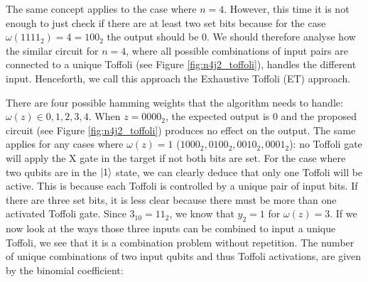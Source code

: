 \documentclass[12pt,a4paper]{article}
\begin{document}
        

The same concept applies to the case where \(n=4\). However, this time it is not enough to just check if there are at least two set bits because for the case \(\omega(1111_2) = 4 = 100_2\) the output should be 0. We should therefore analyse how the similar circuit for \(n=4\), where all possible combinations of input pairs are connected to a unique Toffoli (see Figure \ref{fig:n4j2_toffoli}), handles the different input. Henceforth, we call this approach the Exhaustive Toffoli (ET) approach. 

There are four possible hamming weights that the algorithm needs to handle: \(\omega(z) \in {0, 1, 2, 3, 4}\). When \(z = 0000_2\), the expected output is 0 and the proposed circuit (see Figure \ref{fig:n4j2_toffoli}) produces no effect on the output. The same applies for any cases where \(\omega(z) = 1\) (\(1000_2, 0100_2, 0010_2, 0001_2\)): no Toffoli gate will apply the X gate in the target if not both bits are set. For the case where two qubits are in the \(\ket{1}\) state, we can clearly deduce that only one Toffoli will be active. This is because each Toffoli is controlled by a unique pair of input bits. If there are three set bits, it is less clear because there must be more than one activated Toffoli gate. Since \(3_{10} = 11_2\), we know that \(y_2 = 1\) for \(\omega(z) = 3\). If we now look at the ways those three inputs can be combined to input a unique Toffoli, we see that it is a combination problem without repetition. The number of unique combinations of two input qubits and thus Toffoli activations, are given by the binomial coefficient:
\end{document}
